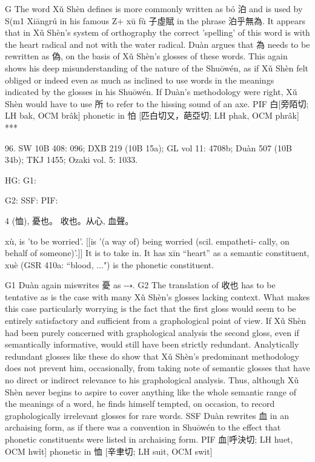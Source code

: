 G   The word Xǔ Shèn defines is more commonly written as bó 泊 and is used by S(m1 Xiāngrú in  his  famous  Z+  xū  fù  子虛賦 in  the  phrase  泊乎無為.  It  appears  that  in  Xǔ  Shèn's  system  of orthography the correct 'spelling' of this word is with the heart radical and not with the water radical.
    Duàn argues that 為 needs to be rewritten as 偽, on the basis of Xǔ Shèn's glosses of these words. This again shows his deep misunderstanding of the nature of the Shuōwén, as if Xǔ Shèn felt obliged or indeed even as much as inclined to use words in the meanings indicated by the glosses in his Shuōwén. If Duàn's methodology were right, Xǔ Shèn would have to use 所 to refer to the hissing sound of an axe.
PIF     白[旁陌切; LH bak, OCM brâk] phonetic in 怕 [匹白切又，葩亞切; LH phak, OCM phrâk]
***



96. SW 10B 408: 096; DXB 219 (10B 15a); GL vol 11: 4708b; Duàn 507 (10B 34b); TKJ 1455; Ozaki vol. 5: 1033.


HG:
G1:

G2: SSF: PIF:

4 (恤),
憂也。
收也。从心, 血聲。


xù,
is 'to be worried'. [[is '(a way of) being worried (scil. empatheti- cally, on behalf of someone)'.]]
It is to take in.
It has xīn ``heart'' as a semantic constituent,
xuè (GSR 410a: ``blood, ...") is the phonetic constituent.

G1   Duàn again miswrites 憂 as ⤏.
G2 The translation of 收也 has to be tentative as is the case with many Xǔ Shèn's glosses lacking context. What makes this case particularly worrying is the fact that the first gloss would seem to be entirely satisfactory and sufficient from a graphological point of view. If Xǔ Shèn had been purely concerned with graphological analysis the second gloss, even if semantically informative, would still have been strictly redundant. Analytically redundant glosses like these do show that Xǔ Shèn's predominant methodology does not prevent him, occasionally, from taking note of semantic glosses that have no direct or indirect relevance to his graphological analysis. Thus, although Xǔ Shèn never begins to aspire to cover anything like the whole semantic range of the meanings of a word, he finds himself tempted, on occasion, to record graphologically irrelevant glosses for rare words.
SSF Duàn rewrites 血 in an archaising form, as if there was a convention in Shuōwén to the effect that phonetic constituents were listed in archaising form.
PIF    血[呼決切; LH huet, OCM hwǐt] phonetic in 恤 [辛聿切; LH suit, OCM swit]

